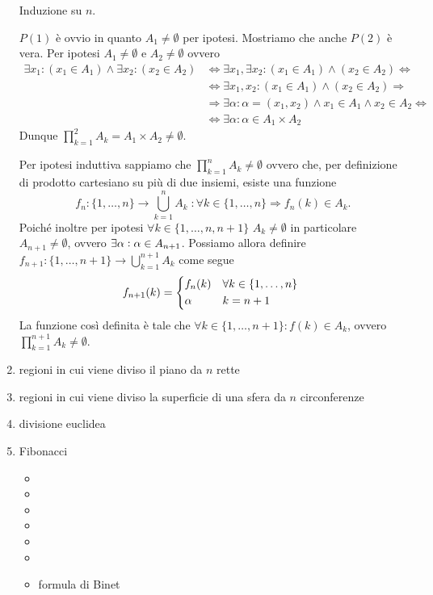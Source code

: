 \begin{enumerate}
  Induzione su $ n $.
  \begin{pbase}
    $ P(1) $ è ovvio in quanto $ A_1 \neq \emptyset $ per ipotesi. Mostriamo che anche $ P(2) $ è vera. Per ipotesi $ A_1 \neq \emptyset $ e $ A_2 \neq \emptyset $ ovvero
    \begin{align*}
      \exists x_1 : (x_1 \in A_1) \wedge \exists x_2 : (x_2 \in A_2) & \iff \exists x_1, \exists x_2 : (x_1 \in A_1) \wedge (x_2 \in A_2) \iff \\
                                                                     & \iff \exists x_1, x_2 : (x_1 \in A_1) \wedge (x_2 \in A_2) \Rightarrow \\
                                                                     & \Rightarrow \exists \alpha : \alpha = (x_1, x_2) \wedge x_1 \in A_1 \wedge x_2 \in A_2 \iff \\
                                                                     & \iff \exists \alpha : \alpha \in A_1 \times A_2
    \end{align*}
    Dunque $ \prod_{k = 1}^{2} A_k = A_1 \times A_2 \neq \emptyset $.
  \end{pbase}
  \begin{pind}
    Per ipotesi induttiva sappiamo che $ \prod_{k = 1}^{n} A_k \neq \emptyset $ ovvero che, per definizione di prodotto cartesiano su più di due insiemi, esiste una funzione \[f_n \colon \{1, \dots, n\} \to \bigcup_{k = 1}^{n} A_k \; : \forall k \in \{1, \dots, n\} \Rightarrow f_n(k) \in A_k.\] Poiché inoltre per ipotesi $ \forall k \in \{1, \dots, n , n + 1\} $ $ A_k \neq \emptyset $ in particolare $ A_{n + 1} \neq \emptyset $, ovvero $ \exists \alpha : \alpha \in \nolinebreak A_{n + 1} $. Possiamo allora definire $ f_{n + 1} \colon \{1, \dots, n + 1\} \to \bigcup_{k = 1}^{n + 1} A_k $ come segue
    \[
      f_{n + 1}(k) =
      \begin{cases*}
        f_{n}(k) & $ \forall k \in \{1, \dots, n\} $ \\
        \alpha & $ k = n + 1 $
      \end{cases*}\]
    La funzione così definita è tale che $ \forall k \in \{1, \dots, n + 1\} : f(k) \in A_k $, ovvero $ \prod_{k = 1}^{n + 1} A_k \neq \emptyset $.
  \end{pind}
\item \textsf{regioni in cui viene diviso il piano da $ n $ rette}
\item \textsf{regioni in cui viene diviso la superficie di una sfera da $ n $ circonferenze}
\item \textsf{divisione euclidea}
\item \textsf{Fibonacci}
  \begin{itemize}
  \item
  \item
  \item
  \item
  \item
  \item
  \item \textsf{formula di Binet}
  \end{itemize}
\end{enumerate}